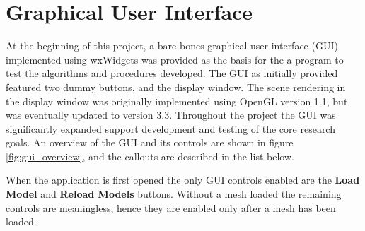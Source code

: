 \section{Graphical User Interface}
At the beginning of this project, a bare bones graphical user interface (GUI) implemented using wxWidgets\cite{wxWidgets} was provided as the basis for the a program to test the algorithms and procedures developed.
The GUI as initially provided featured two dummy buttons, and the display window.
The scene rendering in the display window was originally implemented using OpenGL version 1.1\cite{OpenGL_wiki}, but was eventually updated to version 3.3.
Throughout the project the GUI was significantly expanded support development and testing of the core research goals.
An overview of the GUI and its controls are shown in figure \ref{fig:gui_overview}, and the callouts are described in the list below.

When the application is first opened the only GUI controls enabled are the \textbf{Load Model} and \textbf{Reload Models} buttons.
Without a mesh loaded the remaining controls are meaningless, hence they are enabled only after a mesh has been loaded.

